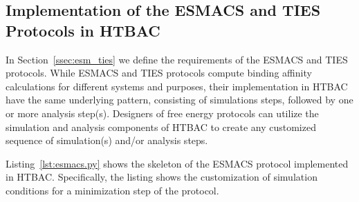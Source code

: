 \subsection{Implementation of the ESMACS and TIES Protocols in HTBAC} 


In Section~\ref{ssec:esm_ties} we define the requirements of the ESMACS and
TIES protocols. While ESMACS and TIES protocols compute binding affinity
calculations for different systems and purposes, their implementation in
HTBAC have the same underlying pattern, consisting of simulations steps,
followed by one or more analysis step(s). Designers of free energy protocols
can utilize the simulation and analysis components of HTBAC to create any
customized sequence of simulation(s) and/or analysis steps.

Listing~\ref{lst:esmacs.py} shows the skeleton of the ESMACS protocol
implemented in HTBAC. Specifically, the listing shows the customization of
simulation conditions for a minimization step of the protocol.






